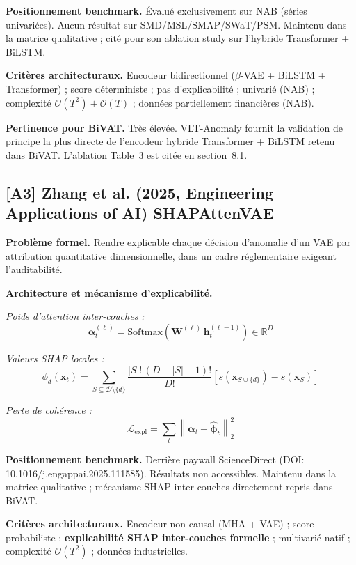 \documentclass[12pt,a4paper]{article}
\begin{document}
\textbf{Positionnement benchmark.} Évalué exclusivement sur NAB (séries
univariées). Aucun résultat sur SMD/MSL/SMAP/SWaT/PSM. Maintenu dans la
matrice qualitative ; cité pour son ablation study sur l'hybride
Transformer + BiLSTM.

\textbf{Critères architecturaux.} Encodeur bidirectionnel ($\beta$-VAE +
BiLSTM + Transformer) ; score déterministe ; pas d'explicabilité ; univarié
(NAB) ; complexité $\mathcal{O}(T^2) + \mathcal{O}(T)$ ; données partiellement
financières (NAB).

\textbf{Pertinence pour BiVAT.} Très élevée. VLT-Anomaly fournit la validation
de principe la plus directe de l'encodeur hybride Transformer + BiLSTM retenu
dans BiVAT. L'ablation Table~3 est citée en section~8.1.

\subsection{[A3] Zhang et al. (2025, Engineering Applications of AI) 
SHAPAttenVAE}

\textbf{Problème formel.} Rendre explicable chaque décision d'anomalie d'un VAE
par attribution quantitative dimensionnelle, dans un cadre réglementaire exigeant
l'auditabilité.

\textbf{Architecture et mécanisme d'explicabilité.}

\textit{Poids d'attention inter-couches :}
$$\boldsymbol{\alpha}^{(\ell)}_t =
\mathrm{Softmax}(\mathbf{W}^{(\ell)}\,\mathbf{h}^{(\ell-1)}_t)
\in \mathbb{R}^D$$

\textit{Valeurs SHAP locales :}
$$\phi_d(\mathbf{x}_t) = \sum_{S \subseteq \mathcal{D}\setminus\{d\}}
\frac{|S|!\,(D-|S|-1)!}{D!}
\left[s(\mathbf{x}_{S\cup\{d\}}) - s(\mathbf{x}_S)\right]$$

\textit{Perte de cohérence :}
$$\mathcal{L}_{\mathrm{expl}} = \sum_t
\left\|\boldsymbol{\alpha}_t - \hat{\boldsymbol{\phi}}_t\right\|_2^2$$

\textbf{Positionnement benchmark.} Derrière paywall ScienceDirect
(DOI: 10.1016/j.engappai.2025.111585). Résultats non accessibles. Maintenu
dans la matrice qualitative ; mécanisme SHAP inter-couches directement repris
dans BiVAT.

\textbf{Critères architecturaux.} Encodeur non causal (MHA + VAE) ; score
probabiliste ; \textbf{explicabilité SHAP inter-couches formelle} ; multivarié
natif ; complexité $\mathcal{O}(T^2)$ ; données industrielles.
\end{document}
